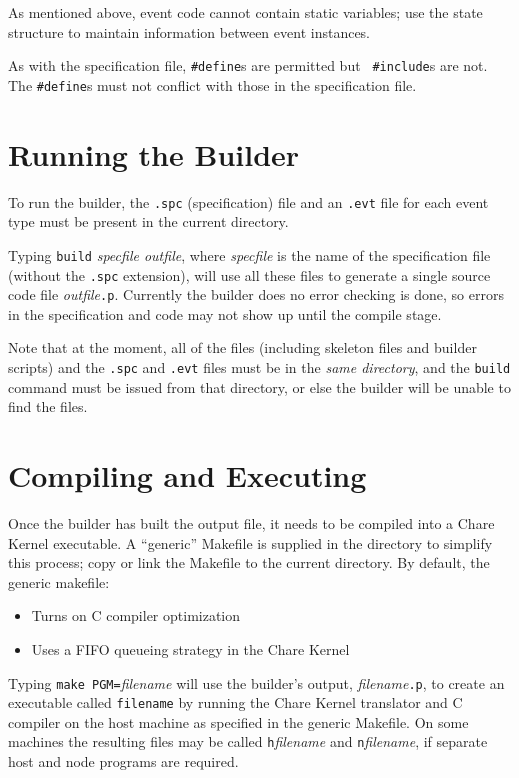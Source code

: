 As mentioned above, event code cannot contain static variables; use the
state structure to maintain information between event instances.

As with the specification file, {\tt \#define}s are permitted but {\tt
\#include}s are not.  The {\tt \#define}s must not conflict with those in
the specification file.
\section{Running the Builder}

To run the builder, the {\tt .spc} (specification) file and
an {\tt .evt} file for each event type must be present in the current
directory. 

Typing {\tt build} {\em specfile outfile}, where {\em specfile} is the name of
the specification file (without the {\tt .spc} extension), will use all
these files to generate a single source code file {\em outfile}{\tt .p}.
Currently the builder does no error checking is done, so errors in the
specification and code may not show up until the compile stage.

Note that at the moment, all of the \dispare files (including skeleton
files and builder scripts) and the {\tt .spc} and {\tt .evt} files must
be in the {\em same directory}, and the {\tt build} command must be
issued from that directory, or else the builder will be unable to find
the files.

\section{Compiling and Executing}

Once the builder has built the output file, it needs to be compiled into
a Chare Kernel executable.  A ``generic'' Makefile is supplied in the
\dispare directory to simplify this process; copy or link the Makefile
to the current directory.  By default, the generic makefile:
\begin{itemize}
\item Turns on C compiler optimization
\item Uses a FIFO queueing strategy in the Chare Kernel
\end{itemize}

Typing {\tt make PGM=}{\em filename} will use the builder's output, {\em
filename}{\tt .p}, to create an executable called {\tt filename} by
running the Chare Kernel translator and C compiler on the host machine
as specified in the generic Makefile.  On some machines the resulting
files may be called {\tt h}{\em filename} and {\tt n}{\em filename}, if
separate host and node programs are required.



